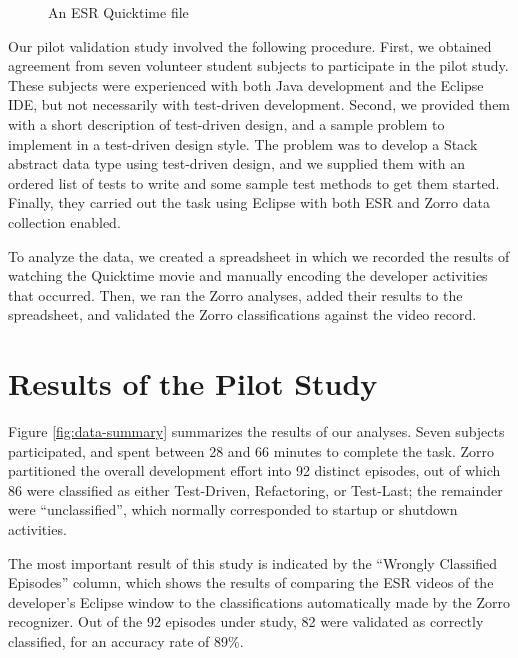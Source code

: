\documentclass[runningheads]{llncs}
\begin{document}
\begin{figure}[ht] 
  \centering
  \caption{An ESR Quicktime file}
  \label{fig:esr}
\end{figure} 

Our pilot validation study involved the following procedure. First, we
obtained agreement from seven volunteer student subjects to participate in the
pilot study. These subjects were experienced with both Java development and
the Eclipse IDE, but not necessarily with test-driven development.  Second,
we provided them with a short description of test-driven design, and a
sample problem to implement in a test-driven design style.  The problem
was to develop a Stack abstract data type using test-driven design, and we
supplied them with an ordered list of tests to write and some sample test
methods to get them started.  Finally, they carried out the task using
Eclipse with both ESR and Zorro data collection enabled. 

To analyze the data, we created a spreadsheet in which we recorded the
results of watching the Quicktime movie and manually encoding the developer
activities that occurred.  Then, we ran the Zorro analyses, added their
results to the spreadsheet, and validated the Zorro classifications against
the video record.

\section{Results of the Pilot Study}
\label{sec:results}

\begin{figure*}[ht] 
  \centering
  \caption{Summary Results}
  \label{fig:data-summary}
\end{figure*} 


Figure \ref{fig:data-summary} summarizes the results of our analyses.
Seven subjects participated, and spent between 28 and 66 minutes to
complete the task.  Zorro partitioned the overall development effort into
92 distinct episodes, out of which 86 were classified as either
Test-Driven, Refactoring, or Test-Last; the remainder were
``unclassified'', which normally corresponded to startup or shutdown
activities.

The most important result of this study is indicated by the ``Wrongly
Classified Episodes'' column, which shows the results of comparing the ESR
videos of the developer's Eclipse window to the classifications
automatically made by the Zorro recognizer.  Out of the 92 episodes under
study, 82 were validated as correctly classified, for an accuracy rate of
89\%.
\end{document}
